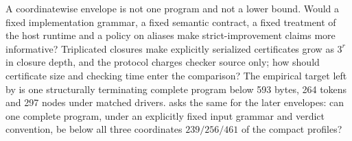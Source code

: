 \begin{question}[Metric]
A coordinatewise envelope is not one program and not a lower bound. Would a
fixed implementation grammar, a fixed semantic contract, a fixed treatment of
the host runtime and a policy on aliases make strict-improvement claims more
informative? Triplicated closures make explicitly serialized certificates grow
as $3^r$ in closure depth, and the protocol charges checker source only; how
should certificate size and checking time enter the comparison? The empirical
target left by  is one structurally terminating
complete program below 593 bytes, 264 tokens and 297 nodes under matched
drivers.  asks the same for the later envelopes: can
one complete program, under an explicitly fixed input grammar and verdict
convention, be below all three coordinates $239/256/461$ of the compact
profiles?
\end{question}
